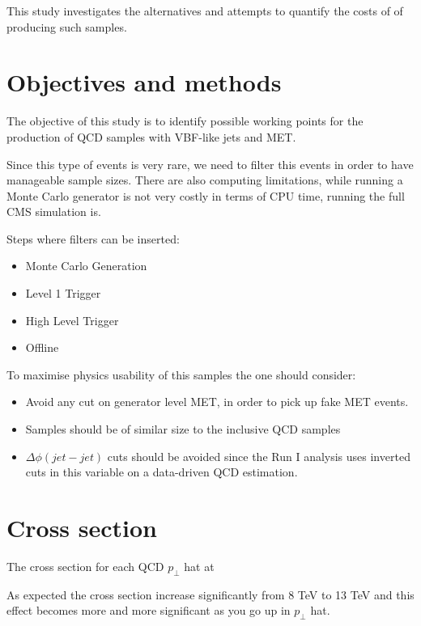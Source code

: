\documentclass[a4paper]{article}
\begin{document}
This study investigates the alternatives and attempts to quantify the costs of of producing such samples.

\section{Objectives and methods}

The objective of this study is to identify possible working points for the production of QCD samples with VBF-like jets and MET. 

Since this type of events is very rare, we need to filter this events in order to have manageable sample sizes. There are also computing limitations, while running a Monte Carlo generator is not very costly in terms of CPU time, running the full CMS simulation is.

Steps where filters can be inserted:
\begin{itemize}
 \item Monte Carlo Generation
 \item Level 1 Trigger
 \item High Level Trigger
 \item Offline
\end{itemize}

To maximise physics usability of this samples the one should consider:
\begin{itemize}
  \item Avoid any cut on generator level MET, in order to pick up fake MET events.
  \item Samples should be of similar size to the inclusive QCD samples
  \item $\Delta\phi(jet-jet)$ cuts should be avoided since the Run I analysis uses inverted cuts in this variable on a data-driven QCD estimation.
\end{itemize}

\section{Cross section}

The cross section for each QCD $p_\perp$ hat at 



As expected the cross section increase significantly from 8 TeV to 13 TeV and this effect becomes more and more significant as you go up in $p_\perp$ hat.


\end{document}
